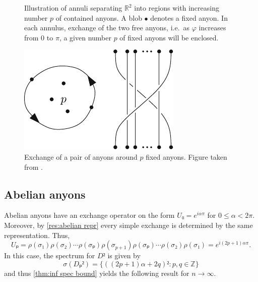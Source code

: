 \begin{figure}[h]
  \centering
  \caption{Illustration of annuli separating $ℝ^2$ into regions with increasing number $p$ of contained anyons. A blob $\bullet$ denotes a fixed anyon. In each annulus, exchange of the two free anyons, i.e.\ as $φ$ increases from $0$ to $π$, a given number $p$ of fixed anyons will be enclosed.}
  \label{fig:annuli}
\end{figure}

\begin{figure}[h]
  \centering
  \includegraphics{img/interchange_loop_p.pdf}
  \caption{Exchange of a pair of anyons around $p$ fixed anyons. Figure taken from \cite{lundholm-solovej}.}
  \label{fig:Up exchange}
\end{figure}








\subsection{Abelian anyons}\label{sec:statistical repulsion abelian ayons}

Abelian anyons have an exchange operator on the form $U₀ = e^{iαπ}$ for $0≤α<2π$. Moreover, by \cref{res:abelian repr} every simple exchange is determined by the same representation. Thus,
\begin{equation}
  Uₚ = ρ(σ₁)ρ(σ₂)⋯ρ(σₚ)ρ(σ_{p+1})ρ(σₚ)⋯ρ(σ₂)ρ(σ₁) = e^{i(2p+1)απ}.
\end{equation}
In this case, the spectrum for $D²$ is given by
\begin{equation}
  σ(Dₚ²) = \{ \left( (2p+1)α + 2q \right)² : p,q ∈ ℤ \}
\end{equation}
and thus \cref{thm:inf spec bound} yields the following result for $n → ∞$.

